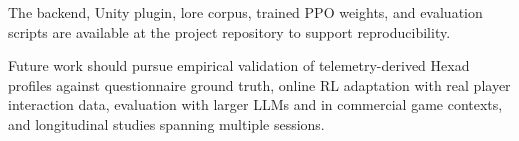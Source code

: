 \documentclass[conference]{IEEEtran}
\begin{document}
The backend, Unity plugin, lore corpus, trained PPO weights, and evaluation scripts are available at the project repository to support reproducibility.

Future work should pursue empirical validation of telemetry-derived Hexad profiles against questionnaire ground truth, online RL adaptation with real player interaction data, evaluation with larger LLMs and in commercial game contexts, and longitudinal studies spanning multiple sessions.

\balance


\end{document}
